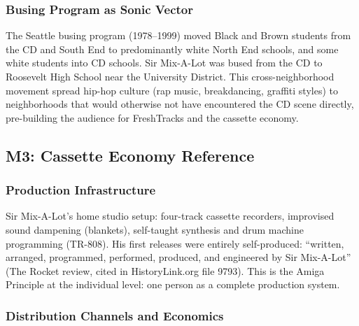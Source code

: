 \documentclass[11pt,letterpaper]{article}
\begin{document}
\subsubsection{Busing Program as Sonic Vector}

The Seattle busing program (1978--1999) moved Black and Brown students from the CD and South End to predominantly white North End schools, and some white students into CD schools. Sir Mix-A-Lot was bused from the CD to Roosevelt High School near the University District. This cross-neighborhood movement spread hip-hop culture (rap music, breakdancing, graffiti styles) to neighborhoods that would otherwise not have encountered the CD scene directly, pre-building the audience for FreshTracks and the cassette economy.

\subsection{M3: Cassette Economy Reference}

\subsubsection{Production Infrastructure}

Sir Mix-A-Lot's home studio setup: four-track cassette recorders, improvised sound dampening (blankets), self-taught synthesis and drum machine programming (TR-808). His first releases were entirely self-produced: ``written, arranged, programmed, performed, produced, and engineered by Sir Mix-A-Lot'' (The Rocket review, cited in HistoryLink.org file 9793). This is the Amiga Principle at the individual level: one person as a complete production system.

\subsubsection{Distribution Channels and Economics}
\end{document}
